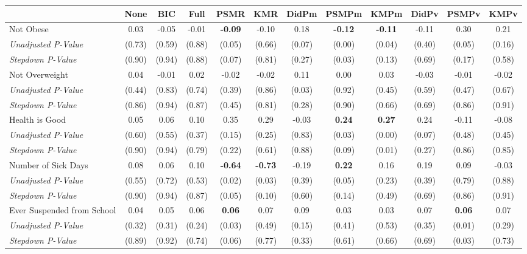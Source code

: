 \begin{tabular}{l c c c c c c c c c c c}
\toprule
 & None & BIC & Full & PSMR & KMR & DidPm & PSMPm & KMPm & DidPv & PSMPv & KMPv \\
\midrule
Not Obese & 0.03 & -0.05 & -0.01 & \textbf{ -0.09 } & -0.10 & 0.18 & \textbf{ -0.12 } & \textbf{ -0.11 } & -0.11 & 0.30 & 0.21 \\
\quad \textit{Unadjusted P-Value} & (0.73) & (0.59) & (0.88) & (0.05) & (0.66) & (0.07) & (0.00) & (0.04) & (0.40) & (0.05) & (0.16) \\
\quad \textit{Stepdown P-Value} & (0.90) & (0.94) & (0.88) & (0.07) & (0.81) & (0.27) & (0.03) & (0.13) & (0.69) & (0.17) & (0.58) \\
Not Overweight & 0.04 & -0.01 & 0.02 & -0.02 & -0.02 & 0.11 & 0.00 & 0.03 & -0.03 & -0.01 & -0.02 \\
\quad \textit{Unadjusted P-Value} & (0.44) & (0.83) & (0.74) & (0.39) & (0.86) & (0.03) & (0.92) & (0.45) & (0.59) & (0.47) & (0.67) \\
\quad \textit{Stepdown P-Value} & (0.86) & (0.94) & (0.87) & (0.45) & (0.81) & (0.28) & (0.90) & (0.66) & (0.69) & (0.86) & (0.91) \\
Health is Good & 0.05 & 0.06 & 0.10 & 0.35 & 0.29 & -0.03 & \textbf{ 0.24 } & \textbf{ 0.27 } & 0.24 & -0.11 & -0.08 \\
\quad \textit{Unadjusted P-Value} & (0.60) & (0.55) & (0.37) & (0.15) & (0.25) & (0.83) & (0.03) & (0.00) & (0.07) & (0.48) & (0.45) \\
\quad \textit{Stepdown P-Value} & (0.90) & (0.94) & (0.79) & (0.22) & (0.61) & (0.88) & (0.09) & (0.01) & (0.27) & (0.86) & (0.85) \\
Number of Sick Days & 0.08 & 0.06 & 0.10 & \textbf{ -0.64 } & \textbf{ -0.73 } & -0.19 & \textbf{ 0.22 } & 0.16 & 0.19 & 0.09 & -0.03 \\
\quad \textit{Unadjusted P-Value} & (0.55) & (0.72) & (0.53) & (0.02) & (0.03) & (0.39) & (0.05) & (0.23) & (0.39) & (0.79) & (0.88) \\
\quad \textit{Stepdown P-Value} & (0.90) & (0.94) & (0.87) & (0.05) & (0.10) & (0.60) & (0.14) & (0.49) & (0.69) & (0.86) & (0.91) \\
Ever Suspended from School & 0.04 & 0.05 & 0.06 & \textbf{ 0.06 } & 0.07 & 0.09 & 0.03 & 0.03 & 0.07 & \textbf{ 0.06 } & 0.07 \\
\quad \textit{Unadjusted P-Value} & (0.32) & (0.31) & (0.24) & (0.03) & (0.49) & (0.15) & (0.41) & (0.53) & (0.35) & (0.01) & (0.29) \\
\quad \textit{Stepdown P-Value} & (0.89) & (0.92) & (0.74) & (0.06) & (0.77) & (0.33) & (0.61) & (0.66) & (0.69) & (0.03) & (0.73) \\
\bottomrule
\end{tabular}
